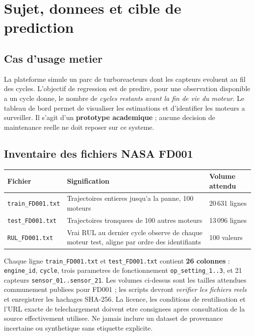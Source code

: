 \documentclass[10pt,a4paper]{article}
\newcommand{\code}[1]{{\small\ttfamily\nolinkurl{#1}}}
\begin{document}
\section{Sujet, donnees et cible de prediction}
\subsection{Cas d'usage metier}
La plateforme simule un parc de turboreacteurs dont les capteurs evoluent au fil des cycles. L'objectif de regression est de predire, pour une observation disponible a un cycle donne, le nombre de \emph{cycles restants avant la fin de vie du moteur}. Le tableau de bord permet de visualiser les estimations et d'identifier les moteurs a surveiller. Il s'agit d'un \textbf{prototype academique} ; aucune decision de maintenance reelle ne doit reposer sur ce systeme.

\subsection{Inventaire des fichiers NASA FD001}
\begin{tabularx}{\linewidth}{@{}p{33mm}Yp{27mm}@{}}
\toprule
\textbf{Fichier} & \textbf{Signification} & \textbf{Volume attendu}\\\midrule
\code{train_FD001.txt} & Trajectoires entieres jusqu'a la panne, 100 moteurs & 20\,631 lignes\\
\code{test_FD001.txt} & Trajectoires tronquees de 100 autres moteurs & 13\,096 lignes\\
\code{RUL_FD001.txt} & Vrai RUL au dernier cycle observe de chaque moteur test, aligne par ordre des identifiants & 100 valeurs\\
\bottomrule
\end{tabularx}
Chaque ligne \code{train_FD001.txt} et \code{test_FD001.txt} contient \textbf{26 colonnes} : \code{engine_id}, \code{cycle}, trois parametres de fonctionnement \code{op_setting_1..3}, et 21 capteurs \code{sensor_01..sensor_21}. Les volumes ci-dessus sont les tailles attendues communement publiees pour FD001 ; les scripts devront \emph{verifier les fichiers reels} et enregistrer les hachages SHA-256. La licence, les conditions de reutilisation et l'URL exacte de telechargement doivent etre consignees apres consultation de la source effectivement utilisee. Ne jamais inclure un dataset de provenance incertaine ou synthetique sans etiquette explicite.
\end{document}
